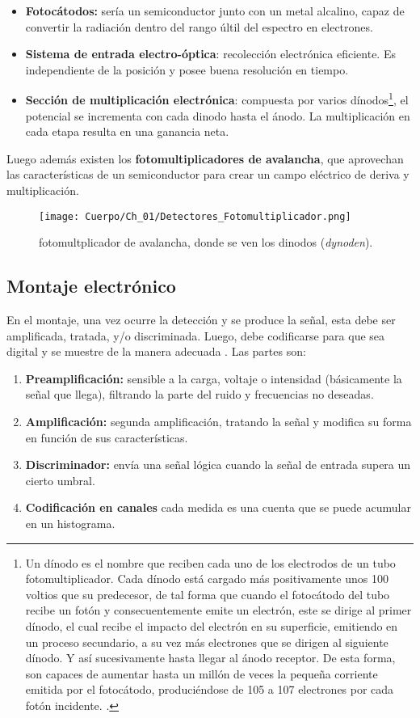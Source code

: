 \begin{itemize}
    \item \textbf{Fotocátodos:} sería un semiconductor junto con un metal alcalino, capaz de convertir la radiación dentro del rango últil del espectro en electrones.
    \item \textbf{Sistema de entrada electro-óptica}: recolección electrónica eficiente. Es independiente de la posición y posee buena resolución en tiempo. 
    \item \textbf{Sección de multiplicación electrónica}: compuesta por varios  dínodos\footnote{Un dínodo es el nombre que reciben cada uno de los electrodos de un tubo fotomultiplicador. Cada dínodo está cargado más positivamente unos 100 voltios que su predecesor, de tal forma que cuando el fotocátodo del tubo recibe un fotón y consecuentemente emite un electrón, este se dirige al primer dínodo, el cual recibe el impacto del electrón en su superficie, emitiendo en un proceso secundario, a su vez más electrones que se dirigen al siguiente dínodo. Y así sucesivamente hasta llegar al ánodo receptor. De esta forma, son capaces de aumentar hasta un millón de veces la pequeña corriente emitida por el fotocátodo, produciéndose de 105 a 107 electrones por cada fotón incidente. \cite{wiki-dinodo}.}, el potencial se incrementa con cada dinodo hasta el ánodo. La multiplicación en cada etapa resulta en una ganancia neta.    
\end{itemize}
Luego además existen los \textbf{fotomultiplicadores de avalancha}, que aprovechan las características de un semiconductor para crear un campo eléctrico de deriva y multiplicación.

\begin{figure}[H] \centering
    \caption{fotomultplicador de avalancha, donde se ven los dinodos (\textit{dynoden}).}
    \texttt{[image: Cuerpo/Ch\_01/Detectores\_Fotomultiplicador.png]}
\end{figure}

\subsection{Montaje electrónico}

En el montaje, una vez ocurre la detección y se produce la señal, esta debe ser amplificada, tratada, y/o discriminada. Luego, debe codificarse para que sea digital y se muestre de la manera adecuada . Las partes son: 

\begin{enumerate}
    \item \textbf{Preamplificación:} sensible a la carga, voltaje o intensidad (básicamente la señal que llega), filtrando la parte del ruido y frecuencias no deseadas. 
    \item \textbf{Amplificación:} segunda amplificación, tratando la señal y modifica su forma en función de sus características.
    \item \textbf{Discriminador:} envía una señal lógica cuando la señal de entrada supera un cierto umbral.
    \item \textbf{Codificación en canales} cada medida es una cuenta que se puede acumular en un histograma. 
\end{enumerate}


